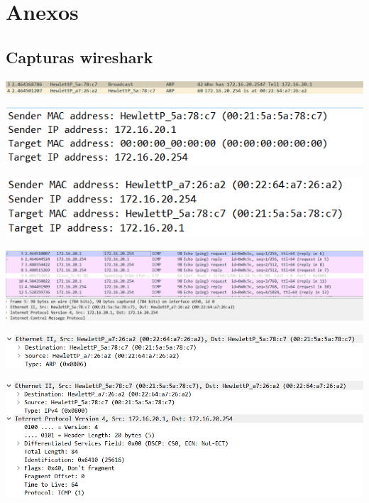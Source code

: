 \documentclass[11pt]{article}
\begin{document}
\pagebreak

\section{Anexos}

\subsection{Capturas wireshark}

\includegraphics[width=\textwidth]{figura1.PNG}

\includegraphics[width=\textwidth]{figura2.PNG}

\includegraphics[width=\textwidth]{figura3.PNG}

\includegraphics[width=\textwidth]{figura4.PNG}

\includegraphics[width=\textwidth]{figura5.PNG}

\includegraphics[width=\textwidth]{figura6.PNG}
\end{document}
